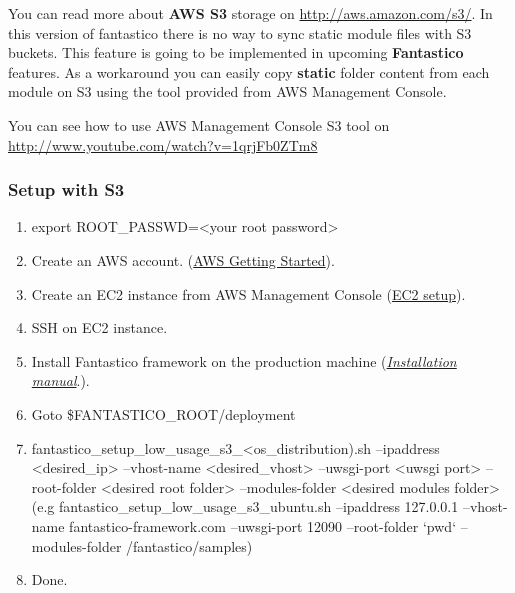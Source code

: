 \documentclass[letterpaper,10pt,english]{sphinxmanual}
\begin{document}
You can read more about \textbf{AWS S3} storage on \href{http://aws.amazon.com/s3/}{http://aws.amazon.com/s3/}. In this version of fantastico there is no
way to sync static module files with S3 buckets. This feature is going to be implemented in upcoming \textbf{Fantastico}
features. As a workaround you can easily copy \textbf{static} folder content from each module on S3 using the tool
provided from AWS Management Console.

You can see how to use AWS Management Console S3 tool on \href{http://www.youtube.com/watch?v=1qrjFb0ZTm8}{http://www.youtube.com/watch?v=1qrjFb0ZTm8}


\subsubsection{Setup with S3}
\label{how_to/deployment/aws_low_usage_scenario:setup-with-s3}\begin{enumerate}
\item {} 
export ROOT\_PASSWD=\textless{}your root password\textgreater{}

\item {} 
Create an AWS account. (\href{http://aws.amazon.com/documentation/gettingstarted/}{AWS Getting Started}).

\item {} 
Create an EC2 instance from AWS Management Console (\href{http://www.youtube.com/watch?v=WBro0TEAd7g}{EC2 setup}).

\item {} 
SSH on EC2 instance.

\item {} 
Install Fantastico framework on the production machine ({\hyperref[get_started/installation::doc]{\emph{Installation manual}}}.).

\item {} 
Goto \$FANTASTICO\_ROOT/deployment

\item {} 
fantastico\_setup\_low\_usage\_s3\_\textless{}os\_distribution).sh --ipaddress \textless{}desired\_ip\textgreater{} --vhost-name \textless{}desired\_vhost\textgreater{} --uwsgi-port \textless{}uwsgi port\textgreater{} --root-folder \textless{}desired root folder\textgreater{} --modules-folder \textless{}desired modules folder\textgreater{} (e.g fantastico\_setup\_low\_usage\_s3\_ubuntu.sh --ipaddress 127.0.0.1 --vhost-name fantastico-framework.com --uwsgi-port 12090 --root-folder {}`pwd{}` --modules-folder /fantastico/samples)

\item {} 
Done.

\end{enumerate}
\end{document}
